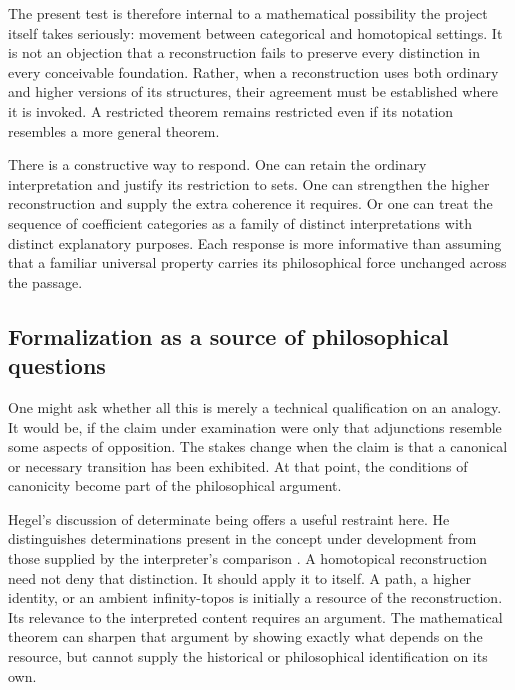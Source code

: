 The present test is therefore internal to a mathematical possibility the
project itself takes seriously: movement between categorical and homotopical
settings. It is not an objection that a reconstruction fails to preserve every
distinction in every conceivable foundation. Rather, when a reconstruction
uses both ordinary and higher versions of its structures, their agreement
must be established where it is invoked. A restricted theorem remains
restricted even if its notation resembles a more general theorem.

There is a constructive way to respond. One can retain the ordinary
interpretation and justify its restriction to sets. One can strengthen the
higher reconstruction and supply the extra coherence it requires. Or one can
treat the sequence of coefficient categories as a family of distinct
interpretations with distinct explanatory purposes. Each response is more
informative than assuming that a familiar universal property carries its
philosophical force unchanged across the passage.

\subsection{Formalization as a source of philosophical questions}

One might ask whether all this is merely a technical qualification on an
analogy. It would be, if the claim under examination were only that adjunctions
resemble some aspects of opposition. The stakes change when the claim is that
a canonical or necessary transition has been exhibited. At that point,
the conditions of canonicity become part of the philosophical argument.

Hegel's discussion of determinate being offers a useful restraint here. He
distinguishes determinations present in the concept under development from
those supplied by the interpreter's comparison \cite{HegelDasein}. A
homotopical reconstruction need not deny that distinction. It should apply it
to itself. A path, a higher identity, or an ambient infinity-topos is initially
a resource of the reconstruction. Its relevance to the interpreted content
requires an argument. The mathematical theorem can sharpen that argument
by showing exactly what depends on the resource, but cannot supply the
historical or philosophical identification on its own.
